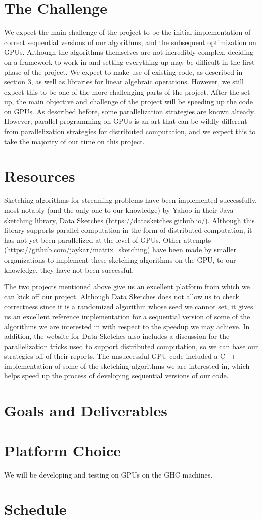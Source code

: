\documentclass[12pt]{article}
\begin{document}
\section{The Challenge}
We expect the main challenge of the project to be the initial implementation of correct sequential versions of our algorithms, and the subsequent optimization on GPUs. Although the algorithms themselves are not incredibly complex, deciding on a framework to work in and setting everything up may be difficult in the first phase of the project. We expect to make use of existing code, as described in section 3, as well as libraries for linear algebraic operations. However, we still expect this to be one of the more challenging parts of the project. After the set up, the main objective and challenge of the project will be speeding up the code on GPUs. As described before, some parallelization strategies are known already. However, parallel programming on GPUs is an art that can be wildly different from parallelization strategies for distributed computation, and we expect this to take the majority of our time on this project.

\section{Resources}
Sketching algorithms for streaming problems have been implemented successfully, most notably (and the only one to our knowledge) by Yahoo in their Java sketching library, Data Sketches (\url{https://datasketches.github.io/}). Although this library supports parallel computation in the form of distributed computation, it has not yet been parallelized at the level of GPUs. Other attempts (\url{https://github.com/jaykar/matrix_sketching}) have been made by smaller organizations to implement these sketching algorithms on the GPU, to our knowledge, they have not been successful. 

The two projects mentioned above give us an excellent platform from which we can kick off our project. Although Data Sketches does not allow us to check correctness since it is a randomized algorithm whose seed we cannot set, it gives us an excellent reference implementation for a sequential version of some of the algorithms we are interested in with respect to the speedup we may achieve. In addition, the website for Data Sketches also includes a discussion for the parallelization tricks used to support distributed computation, so we can base our strategies off of their reports. The unsuccessful GPU code included a C++ implementation of some of the sketching algorithms we are interested in, which helps speed up the process of developing sequential versions of our code. 

\section{Goals and Deliverables}

\section{Platform Choice}
We will be developing and testing on GPUs on the GHC machines.

\section{Schedule}



\end{document}
